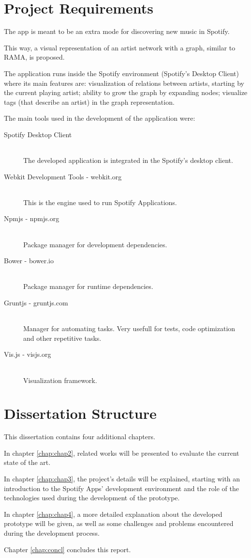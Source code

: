 \section{Project Requirements}
\label{sec:proj}

  The app is meant to be an extra mode for discovering new music in Spotify.

  This way, a visual representation of an artist network with a graph, similar to RAMA, is proposed.

  The application runs inside the Spotify environment (Spotify's Desktop Client) where its main features are: visualization of relations between artists, starting by the current playing artist; ability to grow the graph by expanding nodes; visualize tags (that describe an artist) in the graph representation.

  The main tools used in the development of the application were:

  \begin{description}
    \item[Spotify Desktop Client] \hfill \\
      The developed application is integrated in the Spotify's desktop client.
    \item[Webkit Development Tools - webkit.org] \hfill \\
      This is the engine used to run Spotify Applications.
    \item[Npmjs - npmjs.org] \hfill \\
      Package manager for development dependencies.
    \item[Bower - bower.io] \hfill \\
      Package manager for runtime dependencies.
    \item[Gruntjs - gruntjs.com] \hfill \\
      Manager for automating tasks. Very usefull for tests, code optimization and other repetitive tasks.
    \item[Vis.js - visjs.org] \hfill \\
      Visualization framework.
  \end{description}


\section{Dissertation Structure} \label{sec:struct}

  This dissertation contains four additional chapters.

  In chapter \ref{chap:chap2}, related works will be presented to evaluate the current state of the art.

  In chapter \ref{chap:chap3}, the project's details will be explained, starting with an introduction to the Spotify Apps' development environment and the role of the technologies used during the development of the prototype.

  In chapter \ref{chap:chap4}, a more detailed explanation about the developed prototype will be given, as well as some challenges and problems encountered during the development process.

  Chapter \ref{chap:concl} concludes this report.
